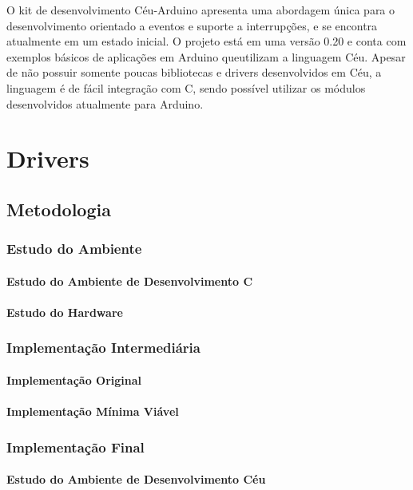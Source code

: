 \documentclass{article}
\begin{document}
\par O kit de desenvolvimento Céu-Arduino apresenta uma abordagem única para o desenvolvimento
orientado a eventos e suporte a interrupções, e se encontra atualmente em um estado inicial. O
projeto está em uma versão 0.20 e conta com exemplos básicos de aplicações em Arduino queutilizam a linguagem Céu. Apesar de não possuir somente poucas bibliotecas e drivers desenvolvidos
em Céu, a linguagem é de fácil integração com C, sendo possível utilizar os módulos desenvolvidos
atualmente para Arduino. \cite{githubceuarduino}

\section{Drivers}

\subsection{Metodologia}
\subsubsection{Estudo do Ambiente}
\paragraph{Estudo do Ambiente de Desenvolvimento C}
\paragraph{Estudo do Hardware}
\subsubsection{Implementação Intermediária}
\paragraph{Implementação Original}
\paragraph{Implementação Mínima Viável}
\subsubsection{Implementação Final}
\paragraph{Estudo do Ambiente de Desenvolvimento Céu}
\end{document}
